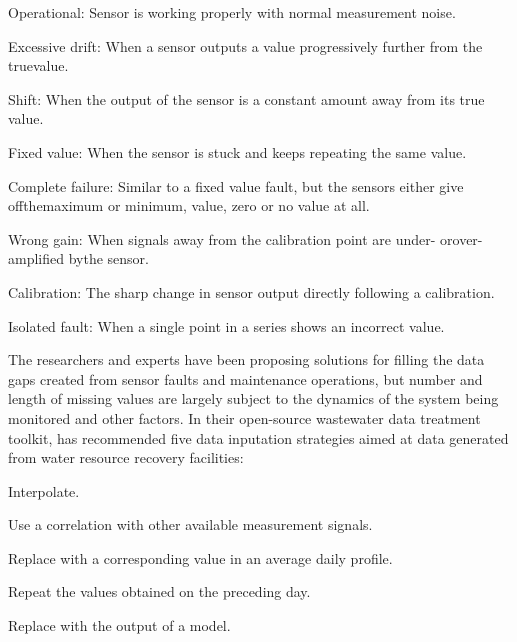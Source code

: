 \noindent
\begin{myenumerate}
    \item Operational: Sensor is working properly with normal measurement noise.
    \item Excessive drift: When a sensor outputs a value progressively further from the truevalue.
    \item Shift: When the output of the sensor is a constant amount away from its true value.
    \item Fixed value: When the sensor is stuck and keeps repeating the same value.
    \item Complete failure: Similar to a fixed value fault, but the sensors either give offthemaximum or minimum, value, zero or no value at all.
    \item Wrong gain: When signals away from the calibration point are under- orover-amplified bythe sensor.
    \item Calibration: The sharp change in sensor output directly following a calibration.
    \item Isolated fault: When a single point in a series shows an incorrect value.
\end{myenumerate}

The researchers and experts have been proposing solutions for filling the data gaps created from sensor faults and maintenance operations, but number and length of missing values are largely subject to the dynamics of the system being monitored and other factors. In their open-source wastewater data treatment toolkit,\citet{demulderOpenSoftwarePackage2018} has recommended five data inputation strategies aimed at data generated from water resource recovery facilities:

\noindent
\begin{myenumerate}
    \item Interpolate.
    \item Use a correlation with other available measurement signals.
    \item Replace with a corresponding value in an average daily profile.
    \item Repeat the values obtained on the preceding day.
    \item Replace with the output of a model. 
\end{myenumerate}

